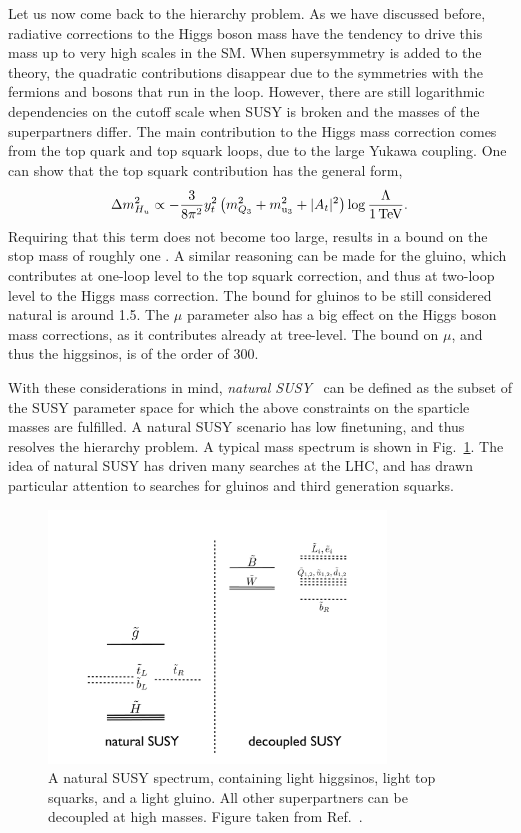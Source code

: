 Let us now come back to the hierarchy problem. As we have discussed before, radiative corrections
to the Higgs boson mass have the tendency to drive this mass up to very high scales in the SM. When
 supersymmetry is added to the theory, the quadratic contributions disappear due to the symmetries
with the fermions and bosons that run in the loop. However, there are still logarithmic dependencies
on the cutoff scale when SUSY is broken and the masses of the superpartners differ. 
The main contribution to the Higgs mass correction comes from the top quark and top squark loops,
due to the large Yukawa coupling. One can show that the top squark contribution has the general
form,
\begin{equation}
  \Delta m_{H_u}^2 \propto - \frac{3}{8\pi^2} y^2_t \left( m^2_{Q_3} + m^2_{\mathrm{u}_3} + |A_t|^2 
  \right) \log \frac{\Lambda}{1\,\text{Te\hspace{-.08em}V}} .
\end{equation}
Requiring that this term does not become too large, results in a bound on the stop mass of roughly
one \TeV. A similar reasoning can be made for the gluino, which contributes at one-loop level to the
top squark correction, and thus at two-loop level to the Higgs mass correction. The bound for
gluinos to be still considered natural is around 1.5\TeV. 
The $\mu$ parameter also has a big effect on the Higgs boson mass corrections, as it contributes
already at tree-level. The bound on $\mu$, and thus the higgsinos, is of the order of 300\GeV. 

With these considerations in mind, \textit{natural SUSY}~\cite{Barbieri:2009ev,Papucci:2011wy} can
be defined as the subset of the SUSY parameter space for which the above constraints on the
sparticle masses are fulfilled. 
A natural SUSY scenario has low finetuning, and thus resolves the hierarchy problem. A typical mass
spectrum is shown in Fig.~\ref{fig:natural_spectrum}. The idea of natural SUSY has driven many
searches at the LHC, and has drawn particular attention to searches for gluinos and third
generation squarks. 


\begin{figure}[t]
  \centering
  \includegraphics[width=0.8\textwidth]{figures/susy/NaturalSpec}
  \caption{ A natural SUSY spectrum, containing light higgsinos, light top squarks, and a light
gluino. All other superpartners can be decoupled at high masses. Figure taken from
Ref.~\cite{Papucci:2011wy}.
  \label{fig:natural_spectrum}}
\end{figure}


